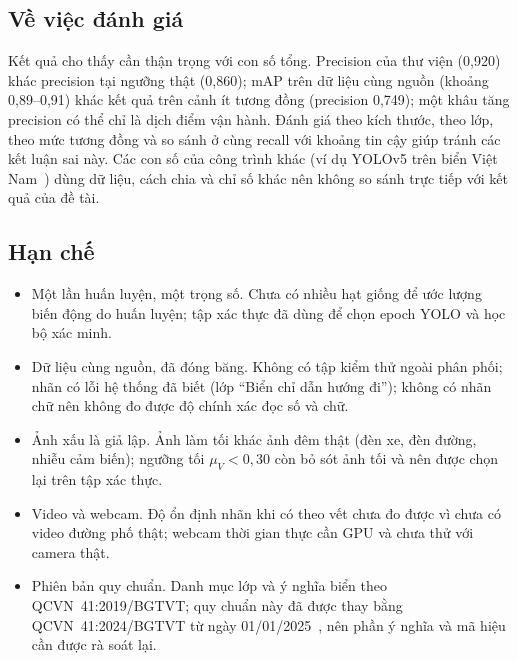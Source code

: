 \subsection{Về việc đánh giá}
Kết quả cho thấy cần thận trọng với con số tổng. Precision của thư viện (0,920) khác precision tại ngưỡng thật (0,860); mAP trên dữ liệu cùng nguồn (khoảng 0,89--0,91) khác kết quả trên cảnh ít tương đồng (precision 0,749); một khâu tăng precision có thể chỉ là dịch điểm vận hành. Đánh giá theo kích thước, theo lớp, theo mức tương đồng và so sánh ở cùng recall với khoảng tin cậy giúp tránh các kết luận sai này. Các con số của công trình khác (ví dụ YOLOv5 trên biển Việt Nam~\cite{tung2024vietnam,cu2024vietnamese}) dùng dữ liệu, cách chia và chỉ số khác nên không so sánh trực tiếp với kết quả của đề tài.

\subsection{Hạn chế}
\label{sec:limitations}
\begin{itemize}
 \item Một lần huấn luyện, một trọng số. Chưa có nhiều hạt giống để ước lượng biến động do huấn luyện; tập xác thực đã dùng để chọn epoch YOLO và học bộ xác minh.
 \item Dữ liệu cùng nguồn, đã đóng băng. Không có tập kiểm thử ngoài phân phối; nhãn có lỗi hệ thống đã biết (lớp ``Biển chỉ dẫn hướng đi''); không có nhãn chữ nên không đo được độ chính xác đọc số và chữ.
 \item Ảnh xấu là giả lập. Ảnh làm tối khác ảnh đêm thật (đèn xe, đèn đường, nhiễu cảm biến); ngưỡng tối $\mu_V<0{,}30$ còn bỏ sót ảnh tối và nên được chọn lại trên tập xác thực.
 \item Video và webcam. Độ ổn định nhãn khi có theo vết chưa đo được vì chưa có video đường phố thật; webcam thời gian thực cần GPU và chưa thử với camera thật.
 \item Phiên bản quy chuẩn. Danh mục lớp và ý nghĩa biển theo QCVN~41:2019/BGTVT; quy chuẩn này đã được thay bằng QCVN~41:2024/BGTVT từ ngày 01/01/2025~\cite{qcvn41_2019}, nên phần ý nghĩa và mã hiệu cần được rà soát lại.
\end{itemize}
